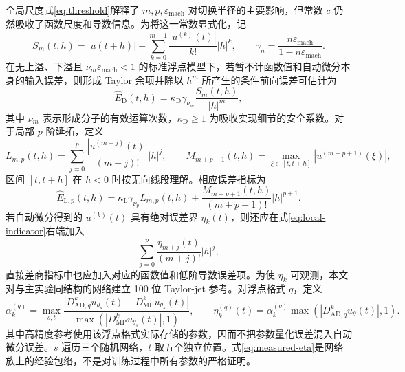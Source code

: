 \documentclass[UTF8,fontset=none,10.5pt,a4paper]{ctexart}
\numberwithin{equation}{section}
\newcommand{\eps}{\varepsilon_{\mathrm{mach}}}
\begin{document}
全局尺度式\eqref{eq:threshold}解释了 $m,p,\eps$ 对切换半径的主要影响，但常数 $c$ 仍然吸收了函数尺度和导数信息。为将这一常数显式化，记
\begin{equation}
S_m(t,h)=|u(t+h)|+
\sum_{k=0}^{m-1}\frac{|u^{(k)}(t)|}{k!}|h|^k,
\qquad
\gamma_n=\frac{n\eps}{1-n\eps}.
\label{eq:direct-scale}
\end{equation}
在无上溢、下溢且 $\nu_m\eps<1$ 的标准浮点模型下\cite{Higham2002}，若暂不计函数值和自动微分本身的输入误差，则形成 Taylor 余项并除以 $h^m$ 所产生的条件前向误差可估计为
\begin{equation}
\widehat E_{\mathrm D}(t,h)
=\kappa_{\mathrm D}\gamma_{\nu_m}
\frac{S_m(t,h)}{|h|^m},
\label{eq:direct-indicator}
\end{equation}
其中 $\nu_m$ 表示形成分子的有效运算次数，$\kappa_{\mathrm D}\ge1$ 为吸收实现细节的安全系数。对于局部 $p$ 阶延拓，定义
\begin{equation}
L_{m,p}(t,h)=
\sum_{j=0}^{p}\frac{|u^{(m+j)}(t)|}{(m+j)!}|h|^j,
\qquad
M_{m+p+1}(t,h)=
\max_{\xi\in[t,t+h]}|u^{(m+p+1)}(\xi)|,
\label{eq:local-scales}
\end{equation}
区间 $[t,t+h]$ 在 $h<0$ 时按无向线段理解。相应误差指标为
\begin{equation}
\widehat E_{\mathrm L,p}(t,h)=
\kappa_{\mathrm L}\gamma_{\nu_p}L_{m,p}(t,h)
+\frac{M_{m+p+1}(t,h)}{(m+p+1)!}|h|^{p+1}.
\label{eq:local-indicator}
\end{equation}
若自动微分得到的 $u^{(k)}(t)$ 具有绝对误差界 $\eta_k(t)$，则还应在式\eqref{eq:local-indicator}右端加入
\begin{equation}
\sum_{j=0}^{p}\frac{\eta_{m+j}(t)}{(m+j)!}|h|^j,
\label{eq:ad-error}
\end{equation}
直接差商指标中也应加入对应的函数值和低阶导数误差项。为使 $\eta_k$ 可观测，本文对与主实验同结构的网络建立 100 位 Taylor-jet 参考。对浮点格式 $q$，定义
\begin{equation}
\alpha_k^{(q)}=\max_{s,t}
\frac{|D^k_{\mathrm{AD},q}u_{\theta_s}(t)-D^k_{\mathrm{MP}}u_{\theta_s}(t)|}
{\max(|D^k_{\mathrm{MP}}u_{\theta_s}(t)|,1)},
\qquad
\eta_k^{(q)}(t)=\alpha_k^{(q)}\max(|D^k_{\mathrm{AD},q}u_\theta(t)|,1).
\label{eq:measured-eta}
\end{equation}
其中高精度参考使用该浮点格式实际存储的参数，因而不把参数量化误差混入自动微分误差。$s$ 遍历三个随机网络，$t$ 取五个独立位置。式\eqref{eq:measured-eta}是网络族上的经验包络，不是对训练过程中所有参数的严格证明。
\end{document}
